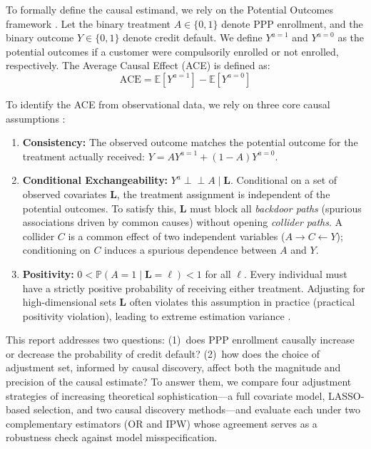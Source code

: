 \documentclass[11pt, a4paper]{article}
\theoremstyle{definition}
\begin{document}
To formally define the causal estimand, we rely on the Potential Outcomes framework
\cite{hernan2020causal}. Let the binary treatment $A \in \{0, 1\}$ denote PPP enrollment,
and the binary outcome $Y \in \{0, 1\}$ denote credit default. We define $Y^{a=1}$ and
$Y^{a=0}$ as the potential outcomes if a customer were compulsorily enrolled or not
enrolled, respectively. The Average Causal Effect (ACE) is defined as:
\begin{equation*}
    \text{ACE} = \mathbb{E}[Y^{a=1}] - \mathbb{E}[Y^{a=0}]
\end{equation*}

To identify the ACE from observational data, we rely on three core causal assumptions
\cite{hernan2020causal}:
\begin{enumerate}
    \item \textbf{Consistency:} The observed outcome matches the potential outcome for the
    treatment actually received: $Y = A Y^{a=1} + (1-A) Y^{a=0}$.
    \item \textbf{Conditional Exchangeability:} $Y^a \perp\!\!\!\perp A \mid \mathbf{L}$.
    Conditional on a set of observed covariates $\mathbf{L}$, the treatment assignment is
    independent of the potential outcomes. To satisfy this, $\mathbf{L}$ must block all
    \textit{backdoor paths} (spurious associations driven by common causes) without opening
    \textit{collider paths}. A collider $C$ is a common effect of two independent variables
    ($A \rightarrow C \leftarrow Y$); conditioning on $C$ induces a spurious dependence
    between $A$ and $Y$.
    \item \textbf{Positivity:} $0 < \mathbb{P}(A=1 \mid \mathbf{L} = \ell) < 1$ for all
    $\ell$. Every individual must have a strictly positive probability of receiving either
    treatment. Adjusting for high-dimensional sets $\mathbf{L}$ often violates this
    assumption in practice (practical positivity violation), leading to extreme estimation
    variance \cite{hernan2020causal}.
\end{enumerate}

This report addresses two questions: (1)~does PPP enrollment causally increase or decrease
the probability of credit default? (2)~how does the choice of adjustment set, informed by
causal discovery, affect both the magnitude and precision of the causal estimate? To answer
them, we compare four adjustment strategies of increasing theoretical sophistication---a
full covariate model, LASSO-based selection, and two causal discovery methods---and evaluate
each under two complementary estimators (OR and IPW) whose agreement serves as a robustness
check against model misspecification.
\end{document}
